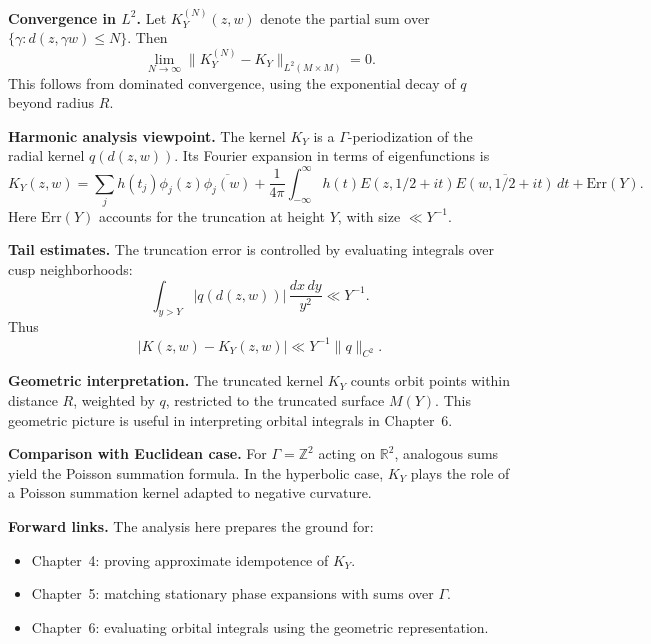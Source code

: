 \medskip

\noindent\textbf{Convergence in $L^{2}$.}
Let $K_{Y}^{(N)}(z,w)$ denote the partial sum over $\{\gamma: d(z,\gamma w)\le N\}$.
Then
\[
  \lim_{N\to\infty} \|K_{Y}^{(N)}-K_{Y}\|_{L^{2}(M\times M)} = 0.
\]
This follows from dominated convergence,
using the exponential decay of $q$ beyond radius $R$.

\medskip

\noindent\textbf{Harmonic analysis viewpoint.}
The kernel $K_{Y}$ is a $\Gamma$-periodization of the radial kernel $q(d(z,w))$.
Its Fourier expansion in terms of eigenfunctions is
\[
  K_{Y}(z,w) = \sum_{j} h(t_{j}) \phi_{j}(z)\overline{\phi_{j}(w)}
  + \frac{1}{4\pi}\int_{-\infty}^{\infty} h(t) E(z,1/2+it)\overline{E(w,1/2+it)}\,dt
  + \mathrm{Err}(Y).
\]
Here $\mathrm{Err}(Y)$ accounts for the truncation at height $Y$,
with size $\ll Y^{-1}$.

\medskip

\noindent\textbf{Tail estimates.}
The truncation error is controlled by evaluating integrals over cusp neighborhoods:
\[
  \int_{y>Y} |q(d(z,w))|\,\frac{dx\,dy}{y^{2}}
  \ll Y^{-1}.
\]
Thus
\[
  |K(z,w)-K_{Y}(z,w)| \ll Y^{-1}\|q\|_{C^{2}}.
\]

\medskip

\noindent\textbf{Geometric interpretation.}
The truncated kernel $K_{Y}$ counts orbit points within distance $R$,
weighted by $q$,
restricted to the truncated surface $M(Y)$.
This geometric picture is useful in interpreting orbital integrals in Chapter~6.

\medskip

\noindent\textbf{Comparison with Euclidean case.}
For $\Gamma=\mathbb{Z}^{2}$ acting on $\mathbb{R}^{2}$,
analogous sums yield the Poisson summation formula.
In the hyperbolic case,
$K_{Y}$ plays the role of a Poisson summation kernel adapted to negative curvature.

\medskip

\noindent\textbf{Forward links.}
The analysis here prepares the ground for:
\begin{itemize}
  \item Chapter~4: proving approximate idempotence of $K_{Y}$.
  \item Chapter~5: matching stationary phase expansions with sums over $\Gamma$.
  \item Chapter~6: evaluating orbital integrals using the geometric representation.
\end{itemize}

\medskip

